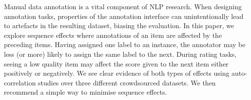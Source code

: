 Manual data annotation is a vital component of NLP research. When designing annotation tasks, properties of the annotation interface can unintentionally lead to artefacts in the resulting dataset, biasing the evaluation. In this paper, we explore sequence effects where annotations of an item are affected by the preceding items. Having assigned one label to an instance, the annotator may be less (or more) likely to assign the same label to the next. During rating tasks, seeing a low quality item may affect the score given to the next item either positively or negatively. We see clear evidence of both types of effects using auto-correlation studies over three different crowdsourced datasets. We then recommend a simple way to minimise sequence effects.
